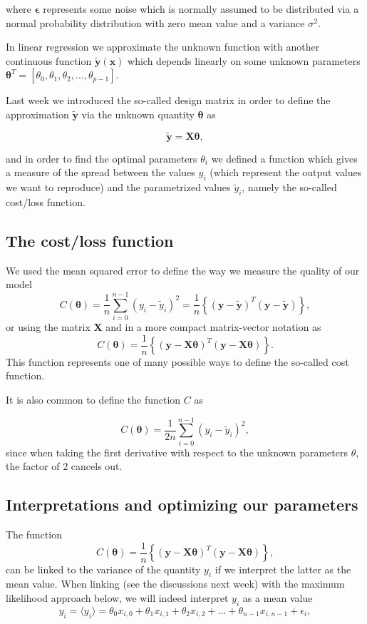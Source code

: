 \documentclass[%
oneside,                 %
final,                   %
10pt]{article}
\begin{document}
where $\bm{\epsilon}$ represents some noise which is normally assumed to
be distributed via a normal probability distribution with zero mean
value and a variance $\sigma^2$.

In linear regression we approximate the unknown function with another
continuous function $\tilde{\bm{y}}(\bm{x})$ which depends linearly on
some unknown parameters
$\bm{\theta}^T=[\theta_0,\theta_1,\theta_2,\dots,\theta_{p-1}]$.

Last week we introduced the so-called design matrix in order to define
the approximation $\bm{\tilde{y}}$ via the unknown quantity
$\bm{\theta}$ as

\[
\bm{\tilde{y}}= \bm{X}\bm{\theta},
\]

and in order to find the optimal parameters $\theta_i$ we defined a function which
gives a measure of the spread between the values $y_i$ (which
represent the output values we want to reproduce) and the parametrized
values $\tilde{y}_i$, namely the so-called cost/loss function.

\subsection*{The cost/loss function}

We used the mean squared error to define the way we measure the quality of our model
\[
C(\bm{\theta})=\frac{1}{n}\sum_{i=0}^{n-1}\left(y_i-\tilde{y}_i\right)^2=\frac{1}{n}\left\{\left(\bm{y}-\bm{\tilde{y}}\right)^T\left(\bm{y}-\bm{\tilde{y}}\right)\right\},
\]
or using the matrix $\bm{X}$ and in a more compact matrix-vector notation as
\[
C(\bm{\theta})=\frac{1}{n}\left\{\left(\bm{y}-\bm{X}\bm{\theta}\right)^T\left(\bm{y}-\bm{X}\bm{\theta}\right)\right\}.
\]
This function represents one of many possible ways to define the so-called cost function.

It is also common to define
the function $C$ as

\[
C(\bm{\theta})=\frac{1}{2n}\sum_{i=0}^{n-1}\left(y_i-\tilde{y}_i\right)^2,
\]
since when taking the first derivative with respect to the unknown parameters $\theta$, the factor of $2$ cancels out. 

\subsection*{Interpretations and optimizing our parameters}

The function 
\[
C(\bm{\theta})=\frac{1}{n}\left\{\left(\bm{y}-\bm{X}\bm{\theta}\right)^T\left(\bm{y}-\bm{X}\bm{\theta}\right)\right\},
\]
can be linked to the variance of the quantity $y_i$ if we interpret the latter as the mean value. 
When linking (see the discussions next week) with the maximum likelihood approach below, we will indeed interpret $y_i$ as a mean value
\[
y_{i}=\langle y_i \rangle = \theta_0x_{i,0}+\theta_1x_{i,1}+\theta_2x_{i,2}+\dots+\theta_{n-1}x_{i,n-1}+\epsilon_i,
\]
\end{document}

